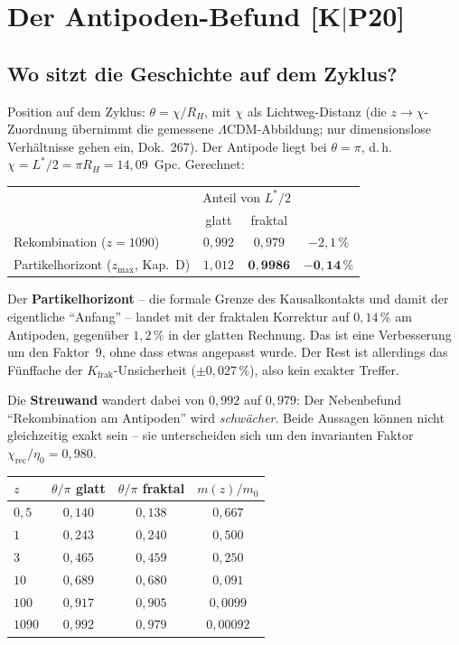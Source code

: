 \documentclass[11pt]{report}
\begin{document}
\chapter{Der Antipoden-Befund [K$|$P20]}

\section{Wo sitzt die Geschichte auf dem Zyklus?}

Position auf dem Zyklus: $\theta = \chi/R_H$, mit $\chi$ als
Lichtweg-Distanz (die $z \to \chi$-Zuordnung übernimmt die
gemessene $\Lambda$CDM-Abbildung; nur dimensionslose Verhältnisse
gehen ein, Dok.~267). Der Antipode liegt bei $\theta = \pi$, d.\,h.
$\chi = L^{*}/2 = \pi R_H = 14{,}09$~Gpc. Gerechnet:

\begin{center}
\begin{tabular}{lccc}
\toprule
 & \multicolumn{2}{c}{Anteil von $L^{*}/2$} & \\
 & glatt & fraktal & \\
\midrule
Rekombination ($z=1090$) & $0{,}992$ & $0{,}979$ & $-2{,}1\,\%$ \\
Partikelhorizont ($z_\text{max}$, Kap.~D) & $1{,}012$ & $\mathbf{0{,}9986}$
  & $\mathbf{-0{,}14\,\%}$ \\
\bottomrule
\end{tabular}
\end{center}

\noindent Der \textbf{Partikelhorizont} -- die formale Grenze des
Kausalkontakts und damit der eigentliche \enquote{Anfang} --
landet mit der fraktalen Korrektur auf $0{,}14\,\%$ am Antipoden,
gegenüber $1{,}2\,\%$ in der glatten Rechnung. Das ist eine
Verbesserung um den Faktor~9, ohne dass etwas angepasst wurde. Der
Rest ist allerdings das Fünffache der $K_\text{frak}$-Unsicherheit
($\pm0{,}027\,\%$), also kein exakter Treffer.

Die \textbf{Streuwand} wandert dabei von $0{,}992$ auf $0{,}979$:
Der Nebenbefund \enquote{Rekombination am Antipoden} wird
\emph{schwächer}. Beide Aussagen können nicht gleichzeitig exakt
sein -- sie unterscheiden sich um den invarianten Faktor
$\chi_\text{rec}/\eta_0 = 0{,}980$.

\begin{center}
\begin{tabular}{lccc}
\toprule
$z$ & $\theta/\pi$ glatt & $\theta/\pi$ fraktal
  & $m(z)/m_0$ \\
\midrule
$0{,}5$ & $0{,}140$ & $0{,}138$ & $0{,}667$ \\
$1$ & $0{,}243$ & $0{,}240$ & $0{,}500$ \\
$3$ & $0{,}465$ & $0{,}459$ & $0{,}250$ \\
$10$ & $0{,}689$ & $0{,}680$ & $0{,}091$ \\
$100$ & $0{,}917$ & $0{,}905$ & $0{,}0099$ \\
$1090$ & $0{,}992$ & $0{,}979$ & $0{,}00092$ \\
\bottomrule
\end{tabular}
\end{center}
\end{document}
